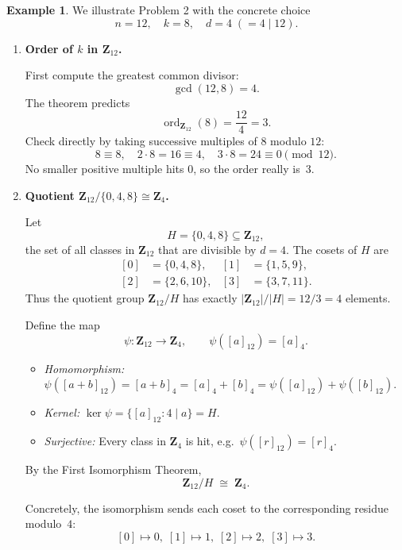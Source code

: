 \documentclass[12pt]{article}
\theoremstyle{definition} %
\newtheorem{example}{Example}
\theoremstyle{plain} %
\begin{document}
\begin{example}
  We illustrate Problem 2 with the concrete choice
  \[
    n=12,\quad k=8,\quad d=4\;(=\!4\mid 12).
  \]

  \begin{enumerate}[label=\textbf{(\alph*)}]
    \item \textbf{Order of $k$ in $\mathbf Z_{12}$.}

          First compute the greatest common divisor:
          \[
            \gcd(12,8)=4.
          \]
          The theorem predicts
          \[
            \operatorname{ord}_{\mathbf Z_{12}}(8)=\frac{12}{4}=3.
          \]
          Check directly by taking successive multiples of $8$ modulo $12$:
          \[
            8\equiv 8,\quad
            2\cdot 8=16\equiv 4,\quad
            3\cdot 8=24\equiv 0\pmod{12}.
          \]
          No smaller positive multiple hits $0$, so the order really is~$3$.

    \item \textbf{Quotient $\mathbf Z_{12}\big/\{0,4,8\}\cong \mathbf Z_{4}$.}

          Let
          \[
            H=\{0,4,8\}\subseteq\mathbf Z_{12},
          \]
          the set of all classes in $\mathbf Z_{12}$ that are divisible by $d=4$.
          The cosets of $H$ are
          \[
            \begin{aligned}
              [0] &= \{0,4,8\}, &
              [1] &= \{1,5,9\},\\
              [2] &= \{2,6,10\}, &
              [3] &= \{3,7,11\}.
            \end{aligned}
          \]
          Thus the quotient group $\mathbf Z_{12}/H$ has exactly \(\lvert\mathbf Z_{12}\rvert/\lvert H\rvert=12/3=4\) elements.

          Define the map
          \[
            \psi : \mathbf Z_{12}\longrightarrow \mathbf Z_{4},
            \qquad
            \psi([a]_{12})=[a]_{4}.
          \]
          \begin{itemize}
            \item \emph{Homomorphism:}\;
                  $\psi([a+b]_{12})=[a+b]_{4}=[a]_{4}+[b]_{4}=\psi([a]_{12})+\psi([b]_{12})$.
            \item \emph{Kernel:}\;
                  $\ker\psi = \{[a]_{12}:4\mid a\}=H$.
            \item \emph{Surjective:}\;
                  Every class in $\mathbf Z_{4}$ is hit, e.g.\ $\psi([r]_{12})=[r]_{4}$.
          \end{itemize}
          By the First Isomorphism Theorem,
          \[
            \mathbf Z_{12}/H \;\cong\; \mathbf Z_{4}.
          \]

          Concretely, the isomorphism sends each coset to the corresponding
          residue modulo~\(4\):
          \[
            [0]\!\mapsto\!0,\;
            [1]\!\mapsto\!1,\;
            [2]\!\mapsto\!2,\;
            [3]\!\mapsto\!3.
          \]
  \end{enumerate}
\end{example}
\end{document}
